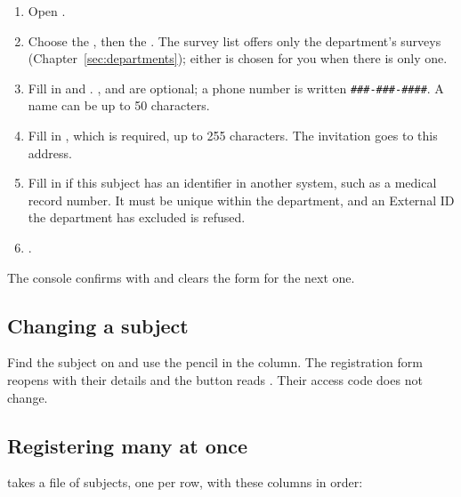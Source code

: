 \documentclass[11pt, a4paper]{article}
\begin{document}
\begin{enumerate}
  \item Open .
  \item Choose the , then the . The survey list offers only the
        department's surveys (Chapter~\ref{sec:departments}); either is chosen for you when there
        is only one.
  \item Fill in  and . ,  and
         are optional; a phone number is written \texttt{\small \#\#\#-\#\#\#-\#\#\#\#}.
        A name can be up to 50 characters.
  \item Fill in , which is required, up to 255 characters. The invitation goes to this
        address.
  \item Fill in  if this subject has an identifier in another system, such as a
        medical record number. It must be unique within the department, and an External ID the
        department has excluded is refused.
  \item {}.
\end{enumerate}


The console confirms with  and clears the form for the next one.


\subsection{Changing a subject}

Find the subject on  and use the pencil in the  column. The
registration form reopens with their details and the button reads . Their
access code does not change.

\subsection{Registering many at once}
\label{sec:csv}

 takes a file of subjects, one per row, with these columns in order:
\end{document}
